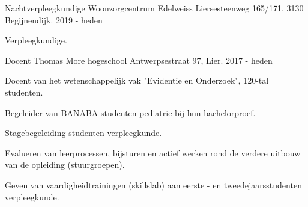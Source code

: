 


\begin{cventries}


\cventry
{Nachtverpleegkundige} %
{Woonzorgcentrum Edelweiss} %
{Liersesteenweg 165/171, 3130 Begijnendijk.} %
{2019 - heden} %
{ %
\begin{cvitems}
	\item Verpleegkundige.
\end{cvitems}
}

\cventry
{Docent} %
{Thomas More hogeschool} %
{Antwerpsestraat 97, Lier.} %
{2017 - heden} %
{ %
\begin{cvitems}
\item Docent van het wetenschappelijk vak "Evidentie en Onderzoek", 120-tal studenten.
\item Begeleider van BANABA studenten pediatrie bij hun bachelorproef.
\item Stagebegeleiding studenten verpleegkunde.
\item Evalueren van leerprocessen, bijsturen en actief werken rond de verdere uitbouw van de opleiding (stuurgroepen).
\item Geven van vaardigheidtrainingen (skillslab) aan eerste - en tweedejaarsstudenten verpleegkunde.
\end{cvitems}
}


\end{cventries}
